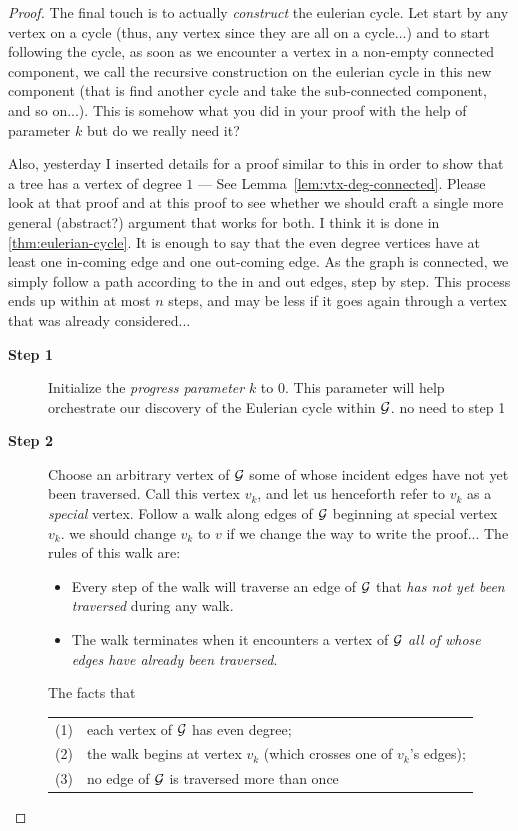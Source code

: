 \begin{proof}
The final touch is to actually \textit{construct} the eulerian cycle. 
Let start by any vertex on a cycle (thus, any vertex since they are all on a cycle...)
and to start following the cycle, as soon as we encounter a vertex in a non-empty connected component, 
we call the recursive construction on the eulerian cycle in this new component
(that is find another cycle and take the sub-connected component, and so on...).
{\Denis This is somehow what you did in your proof with the help of parameter $k$ but do we really need it?}

{\Arny Also, yesterday I inserted details for a proof similar to this in order to show that a tree has
a vertex of degree $1$ --- See Lemma~\ref{lem:vtx-deg-connected}.  Please look at that proof and 
at this proof to see whether we should craft  a single more general (abstract?) argument 
that works for both.}
{\Denis I think it is done in \ref{thm:eulerian-cycle}.
It is enough to say that the even degree vertices have at least one in-coming edge and one out-coming edge.
As the graph is connected, we simply follow a path according to the in and out edges, step by step.
This process ends up within at most $n$ steps, and may be less if it goes again through a vertex that was already considered...}

\begin{description}
\item[{\bf Step 1}]
Initialize the {\it progress parameter} $k$ to $0$.  This parameter
will help orchestrate our discovery of the Eulerian cycle within $\mbox{$\cal G$}$.
{\Denis no need to step 1}

\item[{\bf Step 2}]
Choose an arbitrary vertex of $\mbox{$\cal G$}$ some of whose incident edges have not
yet been traversed.  Call this vertex $v_k$, and let us henceforth refer
to $v_k$ as a {\em special} vertex.  Follow a walk along edges of $\mbox{$\cal G$}$
beginning at special vertex $v_k$.  
{\Denis we should change $v_k$ to $v$ if we change the way to write the proof...}
The rules of this walk are:
\begin{itemize}
\item
Every step of the walk will traverse an edge of $\mbox{$\cal G$}$ that {\em has not yet been traversed} during any walk.
\item
The walk terminates when it encounters a vertex of $\mbox{$\cal G$}$ {\em all of
  whose edges have already been traversed}.
\end{itemize}
The facts that 

\hspace*{.25in}\begin{tabular}{ll}
(1) & each vertex of $\mbox{$\cal G$}$ has even degree; \\
(2) & the walk begins at vertex $v_k$ (which crosses one of $v_k$'s edges); \\
(3) & no edge of $\mbox{$\cal G$}$ is traversed more than once
\end{tabular}


\end{description}
\end{proof}
